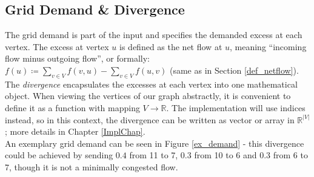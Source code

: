 \subsection{Grid Demand \& Divergence} 
The grid demand is part of the input and specifies the demanded excess at each vertex.
The excess at vertex $u$ is defined as the net flow at $u$, meaning ``incoming flow minus outgoing flow'', or formally: $f(u)\coloneqq \sum_{v\in V}f(v,u)-\sum_{v\in V}f(u,v)$ (same as in Section \ref{def_netflow}).\\
The \textit{divergence} encapsulates the excesses at each vertex into one mathematical object. When viewing the vertices of our graph abstractly, it is convenient to define it as a function with mapping $V\rightarrow \mathbb{R}$. The implementation will use indices instead, so in this context, the divergence can be written as vector or array in $\mathbb{R}^{\vert V\vert}$; more details in Chapter \ref{ImplChap}.\\
An exemplary grid demand can be seen in Figure \ref{ex_demand} - this divergence could be achieved by sending $0.4$ from 11 to 7, $0.3$ from 10 to 6 and $0.3$ from 6 to 7, though it is not a minimally congested flow.
